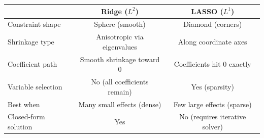 \begin{center}
\begin{tabular}{lcc}
\toprule
& \textbf{Ridge ($L^2$)} & \textbf{LASSO ($L^1$)} \\
\midrule
Constraint shape & Sphere (smooth) & Diamond (corners) \\
Shrinkage type & Anisotropic via eigenvalues & Along coordinate axes \\
Coefficient path & Smooth shrinkage toward 0 & Coefficients hit 0 exactly \\
Variable selection & No (all coefficients remain) & Yes (sparsity) \\
Best when & Many small effects (dense) & Few large effects (sparse) \\
Closed-form solution & Yes & No (requires iterative solver) \\
\bottomrule
\end{tabular}
\end{center}


